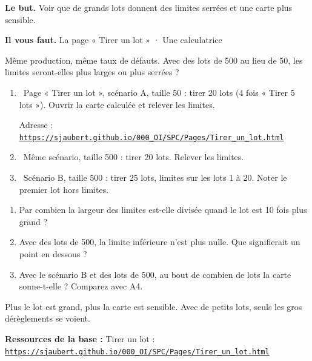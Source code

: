 \documentclass[10pt,a4paper]{article}
\begin{document}
\thispagestyle{fancy}
\begin{tcolorbox}[boite]\textbf{Le but.} Voir que de grands lots donnent des limites serrées et une carte plus sensible.\par\textbf{Il vous faut.} La page « Tirer un lot » · Une calculatrice\end{tcolorbox}
\begin{tcolorbox}[pred]Même production, même taux de défauts. Avec des lots de 500 au lieu de 50, les limites seront-elles plus larges ou plus serrées ?\reponse\end{tcolorbox}
\begin{enumerate}[label=\textcolor{cyan}{\textbf{\arabic*.}},leftmargin=15pt,itemsep=1.5pt]
\item \tagW\ Page « Tirer un lot », scénario A, taille 50 : tirer 20 lots (4 fois « Tirer 5 lots »). Ouvrir la carte calculée et relever les limites.\par Adresse : \href{https://sjaubert.github.io/000_OI/SPC/Pages/Tirer_un_lot.html}{\nolinkurl{https://sjaubert.github.io/000_OI/SPC/Pages/Tirer_un_lot.html}}
\item \tagW\ Même scénario, taille 500 : tirer 20 lots. Relever les limites.
\item \tagW\ Scénario B, taille 500 : tirer 25 lots, limites sur les lots 1 à 20. Noter le premier lot hors limites.
\end{enumerate}
\par
{}
\begin{enumerate}[label=\textcolor{cyan}{\textbf{Q\arabic*.}},leftmargin=22pt]
\item Par combien la largeur des limites est-elle divisée quand le lot est 10 fois plus grand ?\reponse[1]
\item Avec des lots de 500, la limite inférieure n'est plus nulle. Que signifierait un point en dessous ?\reponse[2]
\item Avec le scénario B et des lots de 500, au bout de combien de lots la carte sonne-t-elle ? Comparez avec A4.\reponse[1]
\end{enumerate}
\begin{tcolorbox}[retenir]Plus le lot est grand, plus la carte est sensible. Avec de petits lots, seuls les gros dérèglements se voient.\end{tcolorbox}
\vfill{\footnotesize\color{uimm}\textbf{Ressources de la base :} Tirer un lot : \href{https://sjaubert.github.io/000_OI/SPC/Pages/Tirer_un_lot.html}{\nolinkurl{https://sjaubert.github.io/000_OI/SPC/Pages/Tirer_un_lot.html}}}
\end{document}
